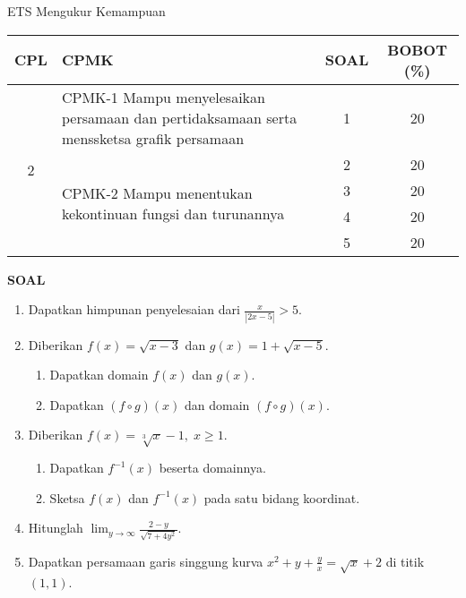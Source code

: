 \documentclass[10pt,openany,a4paper]{article}
\begin{document}
\begin{table}[h]
    \centering
    ETS Mengukur Kemampuan
    \begin{tabular}{|c|m{10.5cm}|c|c|}
        \hline
        CPL & CPMK                                                                                      & SOAL & BOBOT (\%) \\ \hline
        \multirow{5}{*}{2}
            & CPMK-1 Mampu menyelesaikan persamaan dan pertidaksamaan serta menssketsa grafik persamaan & 1    & 20         \\ \cline{2-4}
            & \multirow{4}{*}{CPMK-2 Mampu menentukan kekontinuan fungsi dan turunannya}                & 2    & 20         \\\cline{3-4}
            &                                                                                           & 3    & 20         \\ \cline{3-4}
            &                                                                                           & 4    & 20         \\ \cline{3-4}
            &                                                                                           & 5    & 20         \\ \hline
    \end{tabular}
\end{table}
{\centering\textbf{SOAL}}
\begin{enumerate}
    \item Dapatkan himpunan penyelesaian dari
          $\displaystyle
              \frac{x}{|2x - 5|} > 5.
          $

    \item Diberikan $f(x) = \sqrt{x - 3}$ dan $g(x) = 1 + \sqrt{x - 5}$.
          \begin{enumerate}
              \item Dapatkan domain $f(x)$ dan $g(x)$.
              \item Dapatkan $(f \circ g)(x)$ dan domain $(f \circ g)(x)$.
          \end{enumerate}

    \item Diberikan $f(x) = \sqrt[3]{x} - 1, \; x \geq 1$.
          \begin{enumerate}
              \item Dapatkan $f^{-1}(x)$ beserta domainnya.
              \item Sketsa $f(x)$ dan $f^{-1}(x)$ pada satu bidang koordinat.
          \end{enumerate}

    \item Hitunglah
          $\displaystyle
              \lim_{y \to \infty} \frac{2 - y}{\sqrt{7 + 4y^2}}.
          $

    \item Dapatkan persamaan garis singgung kurva
          $
              x^2 + y + \frac{y}{x} = \sqrt{x} + 2
          $
          di titik $(1,1)$.
\end{enumerate}
\end{document}
